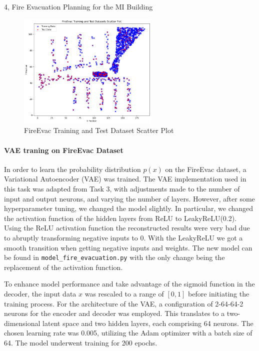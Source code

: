 \begin{task}{4, Fire Evacuation Planning for the MI Building}
\begin{figure}[H]
\centering
\includegraphics[width=0.6\textwidth]{images/FireEvac_visualization.png}
\caption{FireEvac Training and Test Dataset Scatter Plot}
\label{FireEvac_visualization}
\end{figure}

\paragraph{VAE traning on FireEvac Dataset}
In order to learn the probability distribution \( p(x) \) on the FireEvac dataset, a Variational Autoencoder (VAE) was trained. The VAE implementation used in this task was adapted from Task 3, with adjustments made to the number of input and output neurons, and varying the number of layers. However, after some hyperparameter tuning, we changed the model slightly. In particular, we changed the activation function of the hidden layers from ReLU to LeakyReLU(0.2). Using the ReLU activation function the reconstructed results were very bad due to abruptly transforming negative inputs to 0. With the LeakyReLU we got a smooth transition when getting negative inputs and weights. The new model can be found in \verb|model_fire_evacuation.py| with the only change being the replacement of the activation function. 

To enhance model performance and take advantage of the sigmoid function in the decoder, the input data \( x \) was rescaled to a range of \([0, 1]\) before initiating the training process. For the architecture of the VAE, a configuration of 2-64-64-2 neurons for the encoder and decoder was employed. This translates to a two-dimensional latent space and two hidden layers, each comprising 64 neurons. The chosen learning rate was 0.005, utilizing the Adam optimizer with a batch size of 64. The model underwent training for 200 epochs. 


\end{task}
